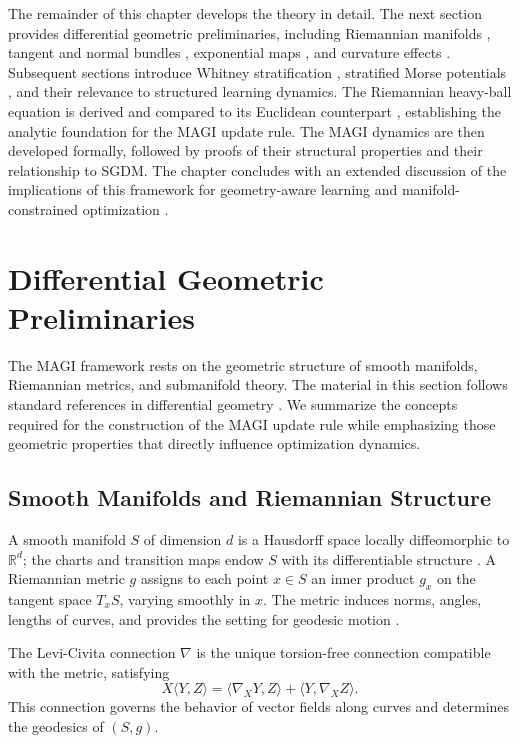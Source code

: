 \documentclass[12pt]{article}
\begin{document}
The remainder of this chapter develops the theory in detail. The next section provides differential geometric preliminaries, including Riemannian manifolds \citep{LeeSmooth2013,LeeRiemannian2018}, tangent and normal bundles \citep{doCarmoRiemannian1992}, exponential maps \citep{CheegerEbin1975}, and curvature effects \citep{Sakai1996}. Subsequent sections introduce Whitney stratification \citep{Whitney1957,Whitney1965}, stratified Morse potentials \citep{Milnor1963,GoreskyMacPherson1988}, and their relevance to structured learning dynamics. The Riemannian heavy-ball equation is derived and compared to its Euclidean counterpart \citep{Polyak1964}, establishing the analytic foundation for the MAGI update rule. The MAGI dynamics are then developed formally, followed by proofs of their structural properties and their relationship to SGDM. The chapter concludes with an extended discussion of the implications of this framework for geometry-aware learning and manifold-constrained optimization \citep{Absil2008,Boumal2023}.

\section{Differential Geometric Preliminaries}

The MAGI framework rests on the geometric structure of smooth manifolds, Riemannian metrics, and submanifold theory. The material in this section follows standard references in differential geometry \citep{LeeSmooth2013,LeeRiemannian2018,doCarmoRiemannian1992,Jost2011,Sakai1996}. We summarize the concepts required for the construction of the MAGI update rule while emphasizing those geometric properties that directly influence optimization dynamics.

\subsection*{Smooth Manifolds and Riemannian Structure}

A smooth manifold $S$ of dimension $d$ is a Hausdorff space locally diffeomorphic to $\mathbb{R}^d$; the charts and transition maps endow $S$ with its differentiable structure \citep{LeeSmooth2013}. A Riemannian metric $g$ assigns to each point $x \in S$ an inner product $g_x$ on the tangent space $T_xS$, varying smoothly in $x$. The metric induces norms, angles, lengths of curves, and provides the setting for geodesic motion \citep{LeeRiemannian2018}.

The Levi-Civita connection $\nabla$ is the unique torsion-free connection compatible with the metric, satisfying
\[
X \langle Y, Z \rangle
=
\langle \nabla_X Y, Z \rangle + \langle Y, \nabla_X Z \rangle.
\]
This connection governs the behavior of vector fields along curves and determines the geodesics of $(S,g)$.
\end{document}
